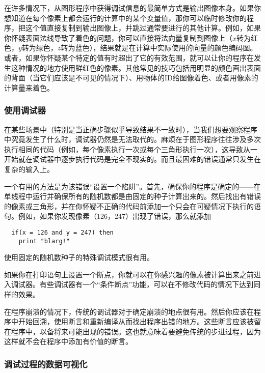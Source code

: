 \documentclass[lang=cn,12pt]{elegantbook}
\begin{document}
在许多情况下，从图形程序中获得调试信息的最简单方式是输出图像本身。如果你想知道在每个像素上都会运行的计算中的某个变量值，那你可以临时修改你的程序，把这个值直接复制到输出图像上，并跳过通常要进行的其他计算。例如，如果你怀疑表面法线导致了着色的问题，你可以直接将法向量复制到图像上（$x$转为红色，$y$转为绿色，$z$转为蓝色），结果就是在计算中实际使用的向量的颜色编码图。或者，如果你怀疑某个特定的值有时超出了它的有效范围，就可以让你的程序在发生这种情况的地方使用鲜红色的像素。其他常见的技巧包括用明显的颜色画出表面的背面（当它们应该是不可见的情况下）、用物体的ID给图像着色、或者用像素的计算量来着色。

\subsubsection{使用调试器}

在某些场景中（特别是当正确步骤似乎导致结果不一致时），当我们想要观察程序中究竟发生了什么时，调试器仍然是无法取代的。麻烦在于图形程序往往涉及多次执行相同的代码（例如，每个像素执行一次或每个三角形执行一次），这导致从一开始就在调试器中逐步执行代码是完全不现实的。而且最困难的错误通常只发生在复杂的输入上。

一个有用的方法是为该错误“设置一个陷阱”。首先，确保你的程序是确定的——在单线程中运行并确保所有的随机数都是由固定的种子计算出来的。然后找出有错误的像素或三角形，并在你怀疑不正确的代码前添加一个只会在可疑情况下执行的语句。例如，如果你发现像素（126，247）出现了错误，那么就添加

\begin{lstlisting}
  if(x = 126 and y = 247) then
    print "blarg!"
\end{lstlisting}

\begin{note}
  使用固定的随机数种子的特殊调试模式很有用。
\end{note}

如果你在打印语句上设置一个断点，你就可以在你感兴趣的像素被计算出来之前进入调试器。有些调试器有一个“条件断点”功能，可以在不修改代码的情况下达到同样的效果。

在程序崩溃的情况下，传统的调试器对于确定崩溃的地点很有用。然后你应该在程序中开始回溯，使用断言和重新编译从而找出程序出错的地方。这些断言应该被留在程序中，以备将来可能出现的错误。这也就意味着要避免传统的步进过程，因为这样就不会在程序中添加有价值的断言。

\subsubsection{调试过程的数据可视化}
\end{document}
